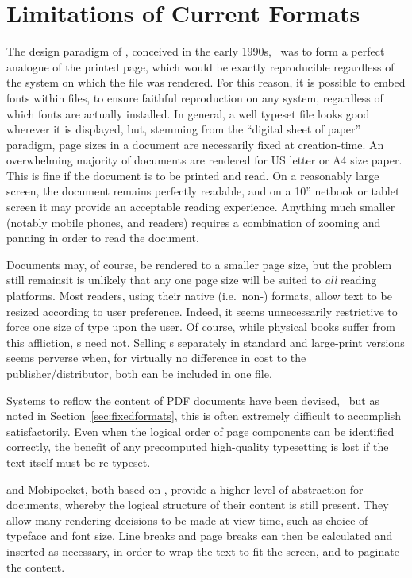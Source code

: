 \section{Limitations of Current Formats}

The design paradigm of \pdf{}, conceived in the early 1990s,~\cite{Warnock1991} was to form a perfect analogue of the printed page, which would be exactly reproducible regardless of the system on which the file was rendered. For this reason, it is possible to embed fonts within \pdf{} files, to ensure faithful reproduction on any system, regardless of which fonts are actually installed. In general, a well typeset \pdf{} file looks good wherever it is displayed, but, stemming from the ``digital sheet of paper'' paradigm, page sizes in a \pdf{} document are necessarily fixed at creation-time. An overwhelming majority of \pdf{} documents are rendered for  US letter or A4 size paper. This is fine if the document is to be printed and read. On a reasonably large screen, the document remains perfectly readable, and on a 10'' netbook or tablet screen it may provide an acceptable reading experience. Anything much smaller (notably mobile phones, and \ebook{} readers) requires a combination of zooming and panning  in order to read the document.

Documents may, of course, be rendered to a smaller page size, but the problem still remains\ed it is unlikely that any one page size will be suited to \emph{all} reading platforms. Most \ebook{} readers, using their native (i.e.\ non-\pdf{}) formats, allow text to be resized according to user preference. Indeed, it seems unnecessarily restrictive to force one size of type upon the user. Of course, while physical books suffer from this affliction, \ebook{}s need not. Selling \ebook{}s separately in standard and large-print versions seems perverse when, for virtually no difference in cost to the publisher/distributor, both can be included in one file.

Systems to reflow the content of PDF documents have been devised,~\cite{Lovegrove1995,Marinai2013} but as noted in Section~\ref{sec:fixedformats}, this is often extremely difficult to accomplish satisfactorily. Even when the logical order of page components can be identified correctly, the benefit of any precomputed high-quality typesetting is lost if the text itself must be re-typeset.



\epub{} and Mobipocket, both based on \html{}, provide a higher level of abstraction for documents, whereby the logical structure of their content is still present. They allow many rendering decisions to be made at view-time, such as choice of typeface and font size. Line breaks and page breaks can then be calculated and inserted as necessary, in order to wrap the text to fit the screen, and to paginate the content.

